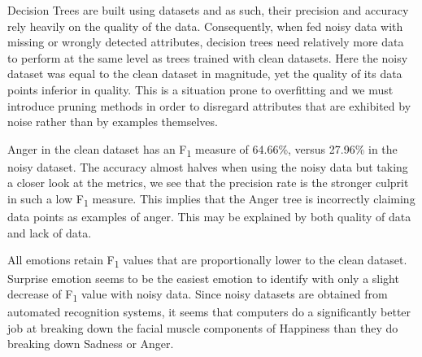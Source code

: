Decision Trees are built using datasets and as such, their precision and accuracy rely heavily on the quality of the data.
Consequently, when fed noisy data with missing or wrongly detected attributes, decision trees need relatively more data to
perform at the same level as trees trained with clean datasets. Here the noisy dataset was equal to the clean dataset in magnitude, yet the quality of its data points
inferior in quality. This is a situation prone to overfitting and we must introduce pruning methods in order to disregard attributes
that are exhibited by noise rather than by examples themselves.

Anger in the clean dataset has an F\textsubscript{1} measure of 64.66\%, versus 27.96\% in the noisy dataset.
The accuracy almost halves when using the noisy data but taking a closer look at the metrics, we see that the precision
rate is the stronger culprit in such a low F\textsubscript{1} measure. This implies that the Anger tree is incorrectly claiming
data points as examples of anger. This may be explained by both quality of data and lack of data.

All emotions retain F\textsubscript{1} values that are proportionally lower to the clean dataset. 
Surprise emotion seems to be the easiest emotion to identify with only a slight decrease of F\textsubscript{1} value with noisy data.
Since noisy datasets are obtained from automated recognition systems, it seems that computers do a significantly better job at
breaking down the facial muscle components of Happiness than they do breaking down Sadness or Anger. 

